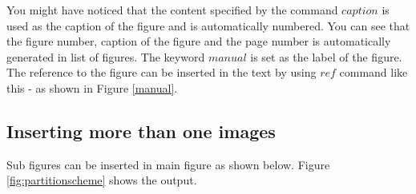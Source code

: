 You might have noticed that the content specified by the command $caption$ is used as the caption of the figure and is automatically numbered. You can see that the figure number, caption of the figure and the page number is automatically generated in list of figures. The keyword $manual$ is set as the label of the figure. The reference to the figure can be inserted in the text by using $ref$ command like this - as shown in Figure \ref{manual}.


\subsection{Inserting more than one images}

Sub figures can be inserted in main figure as shown below. Figure \ref{fig:partitionscheme} shows the output.
\begin{figure}[H]
	
	\centering
	\\
\end{figure}
